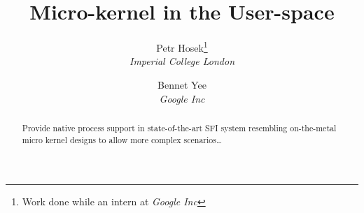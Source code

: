\documentclass[twocolumn,10pt]{article}
\begin{document}
\title{\bf Micro-kernel in the User-space}
\author{
Petr Hosek\footnote{Work done while an intern at \textit{Google Inc}}\\\textit{Imperial College London}
\and Bennet Yee\\\textit{Google Inc}
}
\date{}
\maketitle
\thispagestyle{empty}

\begin{abstract}
  Provide native process support in state-of-the-art SFI system
  resembling on-the-metal micro kernel designs to allow more complex
  scenarios\ldots
\end{abstract}







{
  
  
}
\end{document}
